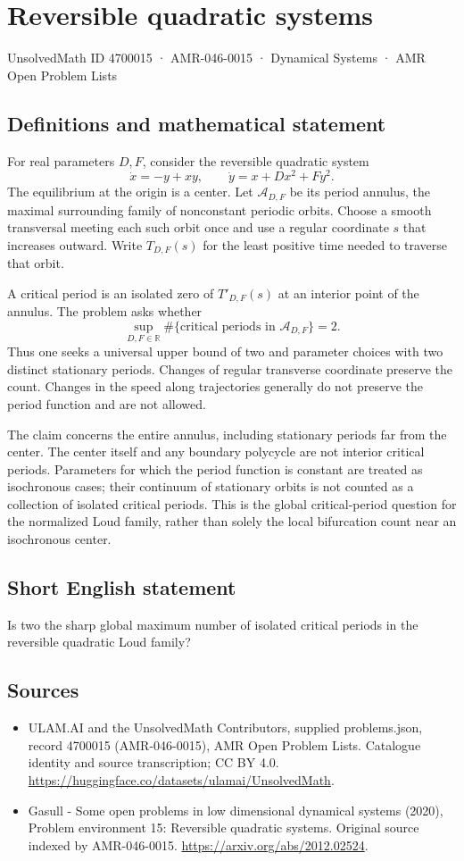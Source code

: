 \documentclass[11pt,a4paper]{article}
\begin{document}
\section*{Reversible quadratic systems}\label{4700015}
{\small UnsolvedMath ID 4700015 · AMR-046-0015 · Dynamical Systems · AMR Open Problem Lists}
\subsection{Definitions and mathematical statement}
For real parameters $D,F$, consider the reversible quadratic system
\[
 \dot x=-y+xy,\qquad \dot y=x+Dx^2+Fy^2.
\]
The equilibrium at the origin is a center. Let $\mathcal A_{D,F}$ be its
period annulus, the maximal surrounding family of nonconstant periodic
orbits. Choose a smooth transversal meeting each such orbit once and use
a regular coordinate $s$ that increases outward. Write $T_{D,F}(s)$ for
the least positive time needed to traverse that orbit.

A critical period is an isolated zero of $T'_{D,F}(s)$ at an interior
point of the annulus. The problem asks whether
\[
 \sup_{D,F\in\mathbb R}
  \#\{\text{critical periods in }\mathcal A_{D,F}\}=2.
\]
Thus one seeks a universal upper bound of two and parameter choices with
two distinct stationary periods. Changes of regular transverse coordinate
preserve the count. Changes in the speed along trajectories generally do
not preserve the period function and are not allowed.

The claim concerns the entire annulus, including stationary periods far
from the center. The center itself and any boundary polycycle are not
interior critical periods. Parameters for which the period function is
constant are treated as isochronous cases; their continuum of stationary
orbits is not counted as a collection of isolated critical periods. This
is the global critical-period question for the normalized Loud family,
rather than solely the local bifurcation count near an isochronous center.
\subsection{Short English statement}
Is two the sharp global maximum number of isolated critical periods in the reversible quadratic Loud family?
\subsection{Sources}
\begin{itemize}
\item[S1] ULAM.AI and the UnsolvedMath Contributors, supplied problems.json, record 4700015 (AMR-046-0015), AMR Open Problem Lists. Catalogue identity and source transcription; CC BY 4.0.
\url{https://huggingface.co/datasets/ulamai/UnsolvedMath}.
\item[S2] Gasull - Some open problems in low dimensional dynamical systems (2020), Problem environment 15: Reversible quadratic systems. Original source indexed by AMR-046-0015.
\url{https://arxiv.org/abs/2012.02524}.
\end{itemize}
\end{document}

